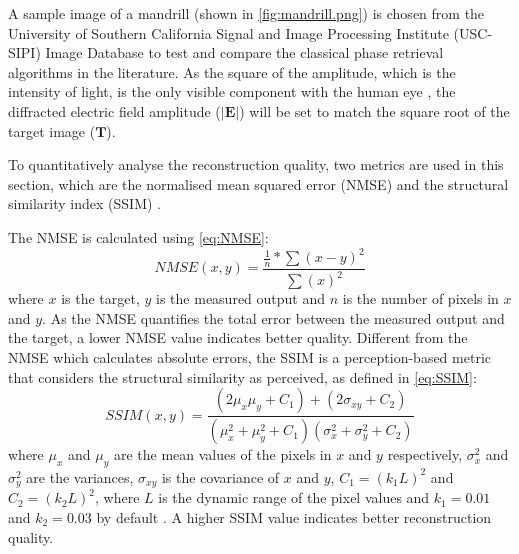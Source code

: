 A sample image of a mandrill (shown in \cref{fig:mandrill.png}) is chosen from the University of Southern California Signal and Image Processing Institute (USC-SIPI) Image Database \cite{MANDRILL_REF} to test and compare the classical phase retrieval algorithms in the literature. As the square of the amplitude, which is the intensity of light, is the only visible component with the human eye \cite{Huang2024}, the diffracted electric field amplitude ($\vert \textbf{E} \vert$) will be set to match the square root of the target image ($\textbf{T}$).

To quantitatively analyse the reconstruction quality, two metrics are used in this section, which are the normalised mean squared error (NMSE) \cite{MSE_REF} and the structural similarity index (SSIM) \cite{Wang2004_SSIM}.

The NMSE is calculated using \cref{eq:NMSE}:
\begin{equation}
  NMSE(x,y) = \frac{\frac{1}{n} * \sum (x - y)^2}{\sum (x)^2}
  \label{eq:NMSE}
\end{equation}
where $x$ is the target, $y$ is the measured output and $n$ is the number of pixels in $x$ and $y$. As the NMSE quantifies the total error between the measured output and the target, a lower NMSE value indicates better quality. Different from the NMSE which calculates absolute errors, the SSIM is a perception-based metric that considers the structural similarity as perceived, as defined in \cref{eq:SSIM}:
\begin{equation}
  SSIM(x,y) = \frac{(2\mu_x\mu_y + C_1) + (2 \sigma _{xy} + C_2)}{(\mu_x^2 + \mu_y^2+C_1) (\sigma_x^2 + \sigma_y^2+C_2)}
  \label{eq:SSIM}
\end{equation}
where $\mu_x$ and $\mu_y$ are the mean values of the pixels in $x$ and $y$ respectively, $\sigma_x^2$ and $\sigma_y^2$ are the variances, $\sigma _{xy}$ is the covariance of $x$ and $y$, $C_1 = (k_1 L)^2$ and $C_2 = (k_2 L)^2$, where $L$ is the dynamic range of the pixel values and $k_1 = 0.01$ and $k_2 = 0.03$ by default \cite{Wang2004_SSIM}. A higher SSIM value indicates better reconstruction quality.


